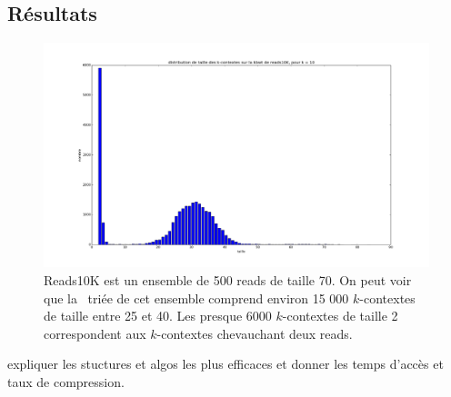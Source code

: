 




%

%
%
%

\subsection{Résultats} 

\begin{figure}[!ht]
    \center
    \includegraphics[scale=0.3]{./images/distribReads10K_k10.png}
    \caption{Reads10K est un ensemble de 500 reads de taille 70. On peut voir que la \kbwt\ triée de cet ensemble comprend environ 15 000 $k$-contextes de taille entre 25 et 40. Les presque 6000 $k$-contextes de taille 2 correspondent aux $k$-contextes chevauchant deux reads.}
    \label{chromato}
\end{figure}

expliquer les stuctures et algos les plus efficaces et donner les temps d'accès et taux de compression.
